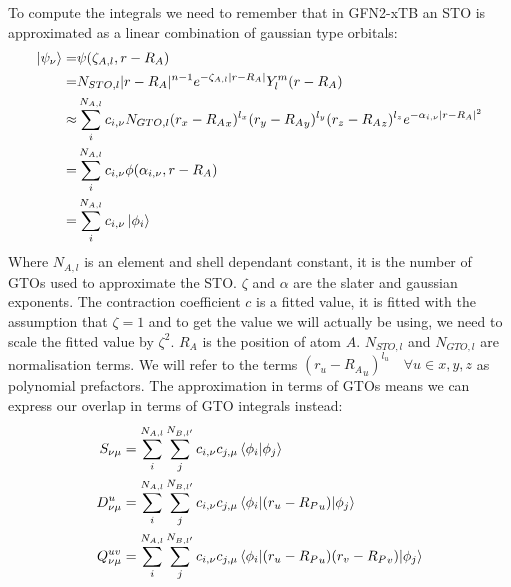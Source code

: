 To compute the integrals we need to remember that in GFN2-xTB an STO is approximated as a linear combination of gaussian type orbitals:
\begin{equation}
    \begin{split}
        \ket{\psi_\nu} =&\psi(\zeta_{A,l},r-R_A) \\
        = &N_{STO,l}|r-R_A|^{n-1}e^{-\zeta_{A,l}|r-R_A|}Y_l^m(r-R_A)\\
        \approx &\sum_i^{N_{A,l}}c_{i,\nu}N_{GTO,l}(r_x-{R_A}_x)^{l_x}(r_y-{R_A}_y)^{l_y}(r_z-{R_A}_z)^{l_z}e^{-\alpha_{i,\nu}|r-R_A|^2}\\
        =& \sum_i^{N_{A,l}}c_{i,\nu}\phi(\alpha_{i,\nu},r-R_A)\\
        =& \sum_i^{N_{A,l}}c_{i,\nu}\ket{\phi_i}
    \end{split}
\end{equation}
Where $N_{A,l}$ is an element and shell dependant constant, it is the number of GTOs used to approximate the STO. $\zeta$ and $\alpha$ are the slater and gaussian exponents. The contraction coefficient $c$ is a fitted value, it is fitted with the assumption that $\zeta=1$ and to get the value we will actually be using, we need to scale the fitted value by $\zeta^2$. $R_A$ is the position of atom $A$. $N_{STO,l}$ and $N_{GTO,l}$ are normalisation terms. 
We will refer to the terms $(r_u-{R_A}_u)^{l_u}\quad\forall{u\in x,y,z}$ as polynomial prefactors. 
The approximation in terms of GTOs means we can express our overlap in terms of GTO integrals instead:
\begin{align}
    S_{\nu\mu} &=\sum_i^{N_{A,l}}\sum_j^{N_{B,l'}}c_{i,\nu}c_{j,\mu} \braket{\phi_i|\phi_j}\\
    D_{\nu\mu}^u &=\sum_i^{N_{A,l}}\sum_j^{N_{B,l'}}c_{i,\nu}c_{j,\mu} \braket{\phi_i|(r_u-{R_P}_u)|\phi_j}\\
    Q_{\nu\mu}^{uv} &=\sum_i^{N_{A,l}}\sum_j^{N_{B,l'}}c_{i,\nu}c_{j,\mu} \braket{\phi_i|(r_u-{R_P}_u)(r_v-{R_P}_v)|\phi_j}
\end{align}
